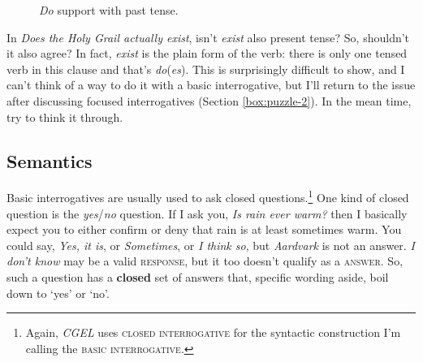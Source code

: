 \begin{figure}
    \centering
    \caption{\textit{Do} support with past tense.}
    \label{fig:do-support-d}
\end{figure}

\begin{tcolorbox}[title=A verb-form puzzle, colback=white, parbox]\label{box:puzzle-1}
\setlength{\parindent}{1.5em}
    \noindent 
    In \textit{Does the Holy Grail actually exist}, isn't \textit{exist} also present tense? So, shouldn't it also agree? In fact, \textit{exist} is the plain form of the verb: there is only one tensed verb in this clause and that's \textit{do}(\textit{es}). This is surprisingly difficult to show, and I can't think of a way to do it with a basic interrogative, but I'll return to the issue after discussing focused interrogatives (Section \ref{box:puzzle-2}). In the mean time, try to think it through.
\end{tcolorbox}

\subsection{Semantics}\label{sec:question-semantics}

Basic interrogatives are usually used to ask closed questions.\footnote{Again, \textit{CGEL} uses \textsc{closed interrogative} for the syntactic construction I'm calling the \textsc{basic interrogative}.} One kind of closed question is the \textit{yes}/\textit{no} question. If I ask you, \textit{Is rain ever warm?} then I basically expect you to either confirm or deny that rain is at least sometimes warm. You could say, \textit{Yes, it is}, or \textit{Sometimes}, or \textit{I think so}, but \textit{Aardvark} is not an answer. \textit{I don't know} may be a valid \textsc{response}, but it too doesn't qualify as a \textsc{answer}. So, such a question has a \textbf{closed} set of answers that, specific wording aside, boil down to `yes' or `no'. 


